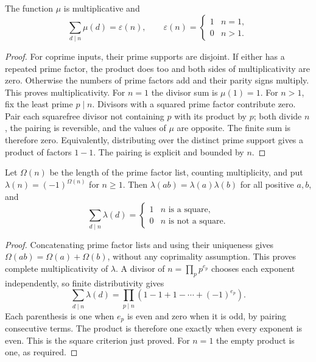 \begin{theorem}\label{el:mobiuscancel}
The function $\mu$ is multiplicative and
\[
 \sum_{d\mid n}\mu(d)=\varepsilon(n),\qquad
 \varepsilon(n)=\begin{cases}1&n=1,\\0&n>1.\end{cases}
\]
\end{theorem}
\begin{proof}
For coprime inputs, their prime supports are disjoint.  If either has
a repeated prime factor, the product does too and both sides of
multiplicativity are zero.  Otherwise the numbers of prime factors
add and their parity signs multiply.  This proves multiplicativity.
For $n=1$ the divisor sum is $\mu(1)=1$.  For $n>1$, fix the least
prime $p\mid n$.  Divisors with a squared prime factor contribute
zero.  Pair each squarefree divisor not containing $p$ with its
product by $p$; both divide $n$, the pairing is reversible, and the
values of $\mu$ are opposite.  The finite sum is therefore zero.
Equivalently, distributing over the distinct prime support gives a
product of factors $1-1$.  The pairing is explicit and bounded by $n$.
\end{proof}

\begin{theorem}
\label{el:liouville}
Let $\Omega(n)$ be the length of the prime factor list, counting
multiplicity, and put $\lambda(n)=(-1)^{\Omega(n)}$ for $n\ge1$.
Then $\lambda(ab)=\lambda(a)\lambda(b)$ for all positive $a,b$, and
\[
 \sum_{d\mid n}\lambda(d)=
 \begin{cases}1&n\text{ is a square},\\0&n\text{ is not a square}.
 \end{cases}
\]
\end{theorem}
\begin{proof}
Concatenating prime factor lists and using their uniqueness gives
$\Omega(ab)=\Omega(a)+\Omega(b)$, without any coprimality assumption.
This proves complete multiplicativity of $\lambda$.  A divisor of
$n=\prod_p p^{e_p}$ chooses each exponent independently, so finite
distributivity gives
\[
 \sum_{d\mid n}\lambda(d)=\prod_{p\mid n}
             (1-1+1-\cdots+(-1)^{e_p}).
\]
Each parenthesis is one when $e_p$ is even and zero when it is odd,
by pairing consecutive terms.  The product is therefore one exactly
when every exponent is even.  This is the square criterion just proved.
For $n=1$ the empty product is one, as required.
\end{proof}

